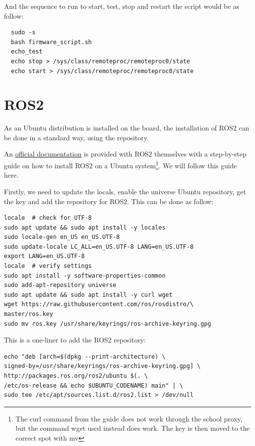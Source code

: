 \documentclass[10pt]{article}
\begin{document}
And the sequence to run to start, test, stop and restart the script would be
as follow:
\begin{tcolorbox}
\begin{verbatim}
  sudo -s
  bash firmware_script.sh
  echo_test
  echo stop > /sys/class/remoteproc/remoteproc0/state
  echo start > /sys/class/remoteproc/remoteproc0/state
\end{verbatim}
\end{tcolorbox}


\pagebreak
\section{ROS2}
\label{sec:ros2}
As an Ubuntu distribution is installed on the board, the installation of ROS2
can be done in a standard way, using the repository.

An \href{https://docs.ros.org/en/humble/Installation/Ubuntu-Install-Debians.html}{official documentation}
is provided with ROS2 themselves with a step-by-step guide on how to install
ROS2 on a Ubuntu system\footnote{The curl command from the guide does not work through the school proxy,
  but the command wget used instead does work. The key is then moved to the correct spot with mv}.
We will follow this guide here.

Firstly, we need to update the locals, enable the universe Ubuntu repository,
get the key and add the repository for ROS2. This can be done as follow:

\begin{tcolorbox}
\begin{verbatim}
locale  # check for UTF-8
sudo apt update && sudo apt install -y locales
sudo locale-gen en_US en_US.UTF-8
sudo update-locale LC_ALL=en_US.UTF-8 LANG=en_US.UTF-8
export LANG=en_US.UTF-8
locale  # verify settings
sudo apt install -y software-properties-common
sudo add-apt-repository universe
sudo apt update && sudo apt install -y curl wget
wget https://raw.githubusercontent.com/ros/rosdistro/\
master/ros.key
sudo mv ros.key /usr/share/keyrings/ros-archive-keyring.gpg
\end{verbatim}
\end{tcolorbox}


This is a one-liner to add the ROS2 repository:

\begin{tcolorbox}
\begin{verbatim}
echo "deb [arch=$(dpkg --print-architecture) \
signed-by=/usr/share/keyrings/ros-archive-keyring.gpg] \
http://packages.ros.org/ros2/ubuntu $(. \
/etc/os-release && echo $UBUNTU_CODENAME) main" | \
sudo tee /etc/apt/sources.list.d/ros2.list > /dev/null

\end{verbatim}
\end{tcolorbox}
\end{document}
